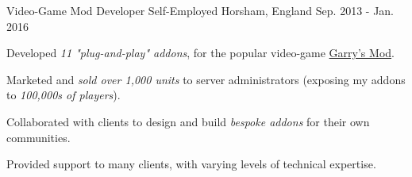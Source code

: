 \begin{cventries}
  \cventry
    {Video-Game Mod Developer}
    {Self-Employed}
    {Horsham, England}
    {Sep. 2013 - Jan. 2016}
    {
      \begin{cvitems}
        \item Developed \textit{11 "plug-and-play" addons}, for the popular video-game \href{https://gmod.facepunch.com/}{Garry's Mod}.
        \item Marketed and \textit{sold over 1,000 units} to server administrators (exposing my addons to \textit{100,000s of players}).
        \item Collaborated with clients to design and build \textit{bespoke addons} for their own communities.
        \item Provided support to many clients, with varying levels of technical expertise.
      \end{cvitems}
    }
    {}


\end{cventries}
